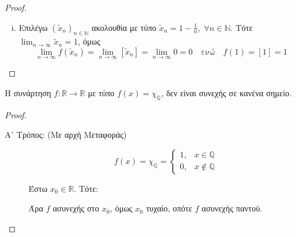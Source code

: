 \documentclass[main.tex]{subfiles}
\begin{document}
\begin{examples}
\begin{enumerate}[wide,labelwidth=!,labelindent=0pt]
\begin{proof}
\begin{enumerate}[i)]
                    \item 
                        Επιλέγω $ (\tilde{x}_{n})_{ n \in \mathbb{N}} $ 
                        ακολουθία με τύπο 
                        $ \tilde{x}_{n} = 1 - \frac{1}{n}, \; \forall n \in 
                        \mathbb{N} $. Τότε
                        $ \lim_{n \to \infty} \tilde{x}_{n} = 1 $, όμως 
                        \[
                            \lim_{n \to \infty} f(\tilde{x}_{n}) = 
                            \lim_{n \to \infty} 
                            [\tilde{x}_{n}] = \lim_{n \to \infty} 0 = 0 \quad 
                            \text{ενώ} \quad  f(1) = [1] = 1 
                        \] 
                \end{enumerate}
            \end{proof}
        \item Η συνάρτηση $ f \colon \mathbb{R} \to \mathbb{R} $ με τύπο 
            $ f(x) = \chi _{\mathbb{Q}} $, δεν είναι συνεχής σε κανένα σημείο.

            \begin{proof} 
            \item {}
                \begin{description}
                    \item [Α᾽ Τρόπος: (Με αρχή Μεταφοράς)]
                        \[
                            f(x) = \chi _{\mathbb{Q}} = \begin{cases} 1, & x \in 
                            \mathbb{Q} \\ 0, & x \not \in \mathbb{Q}\end{cases} 
                        \]

                        Έστω $ x_{0} \in \mathbb{R} $. Τότε:
                        Άρα $f$ ασυνεχής στο $ x_{0} $, όμως $ x_{0} $ τυχαίο, οπότε 
                        $f$ ασυνεχής παντού.


\end{description}
\end{proof}
\end{enumerate}
\end{examples}
\end{document}
